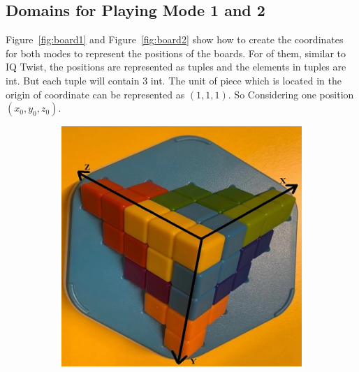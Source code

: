 \subsection{Domains for Playing Mode 1 and 2}
\label{sec:3Ddomains}
Figure~\ref{fig:board1} and Figure~\ref{fig:board2} show how to create the coordinates for both modes to represent the positions of the boards. For of them, similar to IQ Twist, the positions are represented as tuples and the elements in tuples are int. But each tuple will contain 3 int. The unit of piece which is located in the origin of coordinate can be represented as $(1,1,1)$. So Considering one position $(x_{0},y_{0},z_{0})$.
\begin{figure}[htbp]
\centering
\begin{subfigure}[b]{.3\textwidth}
\centering
\includegraphics[width=\textwidth]{figs/ZIGZAGmodel1board.jpg}
\caption{}
\label{figure:mode1A}
\end{subfigure}
\begin{subfigure}[b]{.3\textwidth}
\centering

\end{subfigure}
\end{figure}
